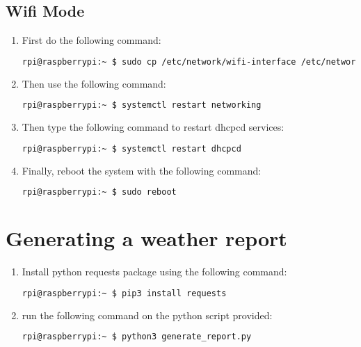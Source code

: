 \documentclass{article}
\begin{document}
    \subsection{Wifi Mode}
    \begin{enumerate}
        \item First do the following command: 
        \begin{lstlisting}[language=bash]
            rpi@raspberrypi:~ $ sudo cp /etc/network/wifi-interface /etc/network/interfaces 
        \end{lstlisting}
        \item  Then use the following command:
         \begin{lstlisting}[language=bash]
            rpi@raspberrypi:~ $ systemctl restart networking
        \end{lstlisting}
        \item Then type the following command to restart dhcpcd services:
        \begin{lstlisting}[language=bash]
            rpi@raspberrypi:~ $ systemctl restart dhcpcd
        \end{lstlisting}
        \item Finally, reboot the system with the following command:
        \begin{lstlisting}[language=bash]
            rpi@raspberrypi:~ $ sudo reboot 
            \end{lstlisting}
    \end{enumerate}


    \section{Generating a weather report}
    \begin{enumerate}
        \item Install python requests package using the following command:
        \begin{lstlisting}[language=bash]
            rpi@raspberrypi:~ $ pip3 install requests
        \end{lstlisting}
        \item run the following command on the python script provided: 
        \begin{lstlisting}[language=bash]
            rpi@raspberrypi:~ $ python3 generate_report.py
        \end{lstlisting}
    \end{enumerate}
\end{document}
